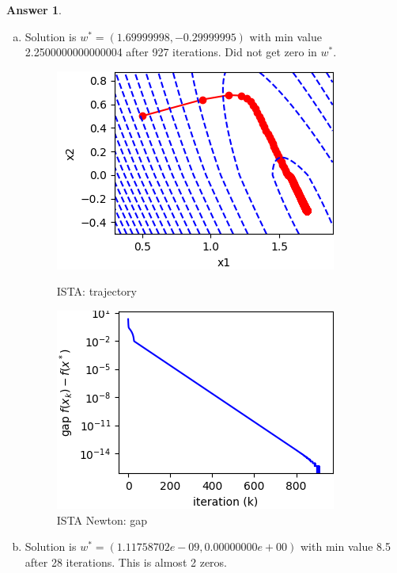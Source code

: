 \documentclass{article}
\theoremstyle{definition}
\newtheorem{ans}{Answer}
\begin{document}
\begin{ans}
\begin{enumerate}[(a)]
			\item Solution is $w^*=(1.69999998,-0.29999995)$ with min value 2.2500000000000004 after 927 iterations. Did not get zero in $w^*$. 
			\begin{figure}[h]
				\begin{minipage}[t]{0.5\linewidth}
					\centering
					\includegraphics[width=0.9\linewidth]{../figures/4/ista_traces_lambda0.1}
					\caption{ISTA: trajectory}
					\label{p33}
				\end{minipage}
				\begin{minipage}[t]{0.5\linewidth}
					\centering
					\includegraphics[width=0.9\linewidth]{../figures/4/ista_gap_lambda0.1}
					\caption{ISTA Newton: gap}
					\label{p34}
				\end{minipage}		
			\end{figure}
			
			\item Solution is $w^*=(1.11758702e-09,0.00000000e+00)$ with min value 8.5 after 28 iterations. This is almost 2 zeros. 
			

\end{enumerate}
\end{ans}
\end{document}
